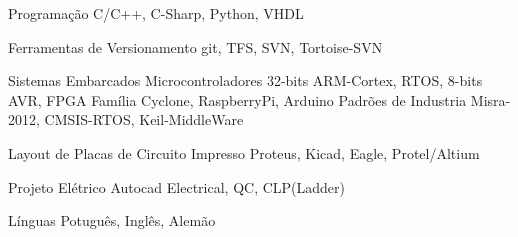 

\begin{cvskills}

  \cvskill
    {Programação} %
    {C/C++, C-Sharp, Python, VHDL} %

  \cvskill
    {Ferramentas de Versionamento} %
    {git, TFS, SVN, Tortoise-SVN} %

  \cvskill
    {Sistemas Embarcados} %
    {Microcontroladores 32-bits ARM-Cortex, RTOS, 8-bits AVR, FPGA Família Cyclone, RaspberryPi, Arduino} %
  \cvskill
    {Padrões de Industria} %
    {Misra-2012, CMSIS-RTOS, Keil-MiddleWare} %
 
  \cvskill
    {Layout de Placas de Circuito Impresso} %
    {Proteus, Kicad, Eagle, Protel/Altium} %
 
  \cvskill
    {Projeto Elétrico} %
    {Autocad Electrical, QC, CLP(Ladder)} %



  \cvskill
    {Línguas} %
    {Potuguês, Inglês, Alemão} %

\end{cvskills}
